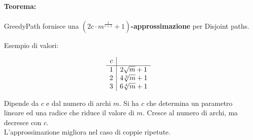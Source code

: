 \paragraph{Teorema:} GreedyPath fornisce una \textbf{$\left(2c \cdot m^{\frac{1}{c+1}} + 1\right)$-approssimazione} per Disjoint paths.

\vfill

Esempio di valori:
\begin{center}
	$$
	\begin{array}{c | c}
		c & \\
		\hline
		1 & 2 \sqrt{m} + 1 \\
		2 & 4 \sqrt[3]{m} + 1 \\
		3 & 6 \sqrt[4]{m} + 1 \\
	\end{array}
	$$
\end{center}

Dipende da $c$ e dal numero di archi $m$. Si ha $c$ che determina un parametro lineare ed una radice che riduce il valore di $m$. Cresce al numero di archi, ma decresce con $c$.\\


L'approssimazione migliora nel caso di coppie ripetute.\\

\newpage